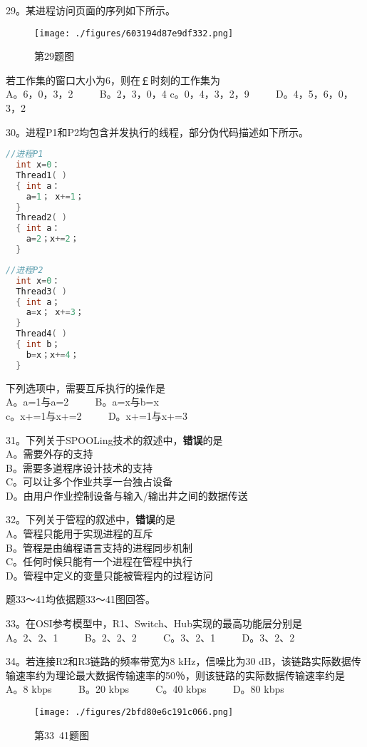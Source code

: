 29。某进程访问页面的序列如下所示。
\begin{figure}[ht]
\centering
\texttt{[image: ./figures/603194d87e9df332.png]}
\caption{第29题图} \label{fig_CSN16_3}
\end{figure}
若工作集的窗口大小为6，则在￡时刻的工作集为 \\
A。{6，0，3，2} $\qquad$ B。{2，3，0，4}
c。{0，4，3，2，9} $\qquad$ D。{4，5，6，0，3，2}

30。进程P1和P2均包含并发执行的线程，部分伪代码描述如下所示。 \\
\begin{lstlisting}[language=cpp]
//进程P1
  int x=0：
  Thread1( )
  { int a：
    a=1； x+=1；
  }
  Thread2( )
  { int a：
    a=2；x+=2；
  }
\end{lstlisting}

\begin{lstlisting}[language=cpp]
//进程P2
  int x=0：
  Thread3( )
  { int a；
    a=x； x+=3；
  }
  Thread4( )
  { int b；
    b=x；x+=4；
  }
\end{lstlisting}
下列选项中，需要互斥执行的操作是 \\
A。a=1与a=2 $\qquad$ B。a=x与b=x \\
c。x+=1与x+=2 $\qquad$ D。x+=1与x+=3

31。下列关于SPOOLing技术的叙述中，\textbf{错误}的是 \\
A。需要外存的支持 \\
B。需要多道程序设计技术的支持 \\
C。可以让多个作业共享一台独占设备 \\
D。由用户作业控制设备与输入/输出井之间的数据传送

32。下列关于管程的叙述中，\textbf{错误}的是 \\
A。管程只能用于实现进程的互斥 \\
B。管程是由编程语言支持的进程同步机制 \\
C。任何时候只能有一个进程在管程中执行 \\
D。管程中定义的变量只能被管程内的过程访问

题33～41均依据题33～41图回答。

33。在OSI参考模型中，R1、Switch、Hub实现的最高功能层分别是 \\
A。2、2、1 $\qquad$ B。2、2、2 $\qquad$ C。3、2、1 $\qquad$ D。3、2、2

34。若连接R2和R3链路的频率带宽为8 kHz，信噪比为30 dB，该链路实际数据传输速率约为理论最大数据传输速率的50％，则该链路的实际数据传输速率约是 \\
A。8 kbps $\qquad$ B。20 kbps $\qquad$ C。40 kbps $\qquad$ D。80 kbps
\begin{figure}[ht]
\centering
\texttt{[image: ./figures/2bfd80e6c191c066.png]}
\caption{第33~41题图} \label{fig_CSN16_4}
\end{figure}

